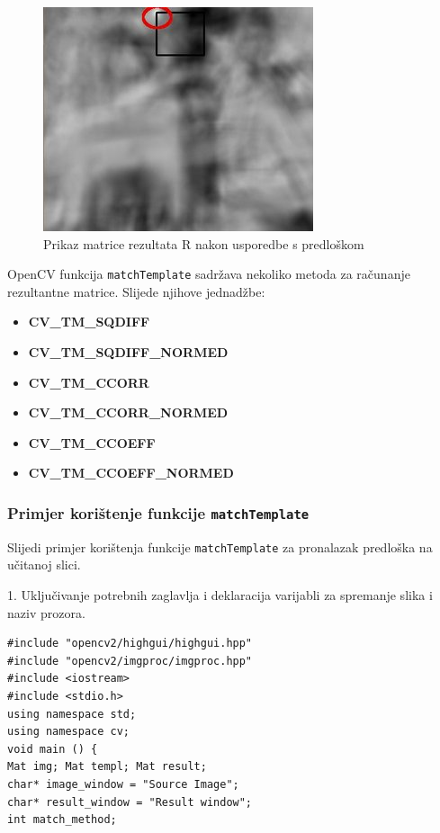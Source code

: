 \begin{figure}[h]
\centering
\includegraphics[scale=0.8]{figures/tm3.jpg}
\caption{Prikaz matrice rezultata R nakon usporedbe s predloškom}
\label{fig:tm3.jpg}
\end{figure}

OpenCV funkcija \texttt{matchTemplate} sadržava nekoliko metoda za
računanje rezultantne matrice. Slijede njihove jednadžbe:
\begin{itemize}
    \item \textbf{CV\_TM\_SQDIFF} 
    \item \textbf{CV\_TM\_SQDIFF\_NORMED} 
    \item \textbf{CV\_TM\_CCORR} 
    \item \textbf{CV\_TM\_CCORR\_NORMED} 
    \item \textbf{CV\_TM\_CCOEFF} 
    \item \textbf{CV\_TM\_CCOEFF\_NORMED} 
\end{itemize}

\newpage
\subsubsection{Primjer korištenje funkcije \texttt{matchTemplate} } %
\label{ssub:Primjer korištenje funkcije }

Slijedi primjer korištenja funkcije \texttt{matchTemplate} za pronalazak
predloška na učitanoj slici.

1. Uključivanje potrebnih zaglavlja i deklaracija varijabli za spremanje
slika i naziv prozora.
\begin{lstlisting}[label=lst1,caption={}]
#include "opencv2/highgui/highgui.hpp"
#include "opencv2/imgproc/imgproc.hpp"
#include <iostream>
#include <stdio.h>
using namespace std;
using namespace cv;
void main () {
Mat img; Mat templ; Mat result;
char* image_window = "Source Image";
char* result_window = "Result window";
int match_method;
\end{lstlisting}

